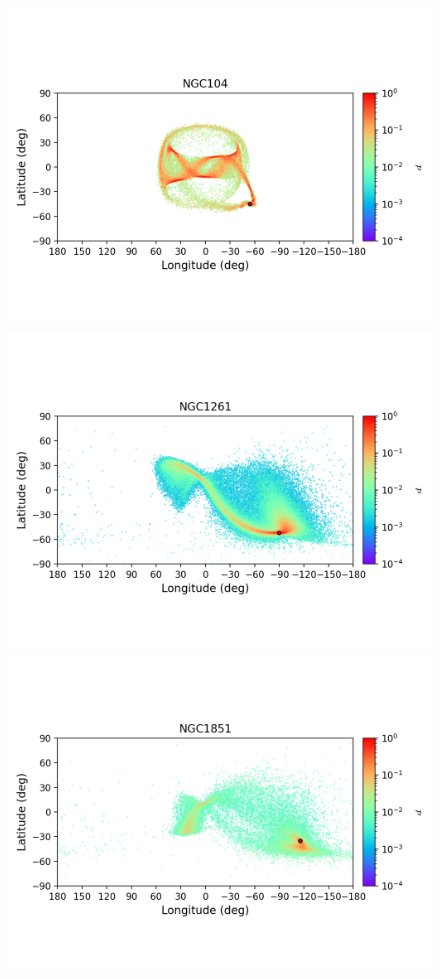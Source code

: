         \begin{figure}
        \includegraphics[clip=true, trim = 0mm 20mm 0mm 10mm, width=1\columnwidth]{images/error_plots_NGC104.png}
        \includegraphics[clip=true, trim = 0mm 20mm 0mm 10mm, width=1\columnwidth]{images/error_plots_NGC1261.png}
        \includegraphics[clip=true, trim = 0mm 20mm 0mm 10mm, width=1\columnwidth]{images/error_plots_NGC1851.png}

\end{figure}
